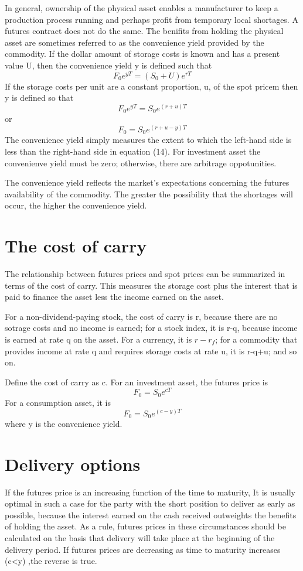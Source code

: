 \documentclass{article}
\begin{document}
In general, ownership of the physical asset enables a manufacturer to keep a production process running and perhaps profit from temporary local shortages. A futures contract does not do the same. The benifits from holding the physical asset are sometimes referred to as the convenience yield provided by the commodity. If the dollar amount of storage costs is known and has a present value U, then the convenience yield y is defined such that
\[
F_0e^{yT}=(S_0+U)e^{rT}
\]
If the storage costs per unit are a constant proportion, u, of the spot pricem then y is defined so that
\[
F_0e^{yT}=S_0e^{(r+u)T}
\]
or
\begin{equation}
	F_0=S_0e^{(r+u-y)T}
\end{equation}
The convenience yield simply measures the extent to which the left-hand side is less than the right-hand side in equation (14). For investment asset the convenienve yield must be zero; otherwise, there are arbitrage oppotunities.

The convenience yield reflects the market's expectations concerning the futures availability of the commodity. The greater the possibility that the shortages will occur, the higher the convenience yield.

\section{The cost of carry}
The relationship between futures prices and spot prices can be summarized in terms of the cost of carry. This measures the storage cost plus the interest that is paid to finance the asset less the income earned on the asset.

For a non-dividend-paying stock, the cost of carry is r, because there are no sotrage costs and no income is earned; for a stock index, it is r-q, because income is earned at rate q on the asset. For a currency, it is $ r-r_f $; for a commodity that provides income at rate q and requires storage costs at rate u, it is r-q+u; and so on.

Define the cost of carry as c. For an investment asset, the futures price is
\begin{equation}
	F_0=S_0e^{cT}
\end{equation}
For a consumption asset, it is
\begin{equation}
	F_0=S_0e^{(c-y)T}
\end{equation}
where y is the convenience yield.

\section{Delivery options}
If the futures price is an increasing function of the time to maturity, It is usually optimal in such a case for the party with the short position to deliver as early as possible, because the interest earned on the cash received outweights the benefits of holding the asset. As a rule, futures prices in these circumstances should be calculated on the basis that delivery will take place at the beginning of the delivery period. If futures prices are decreasing as time to maturity increases (c<y) ,the reverse is true.
\end{document}
